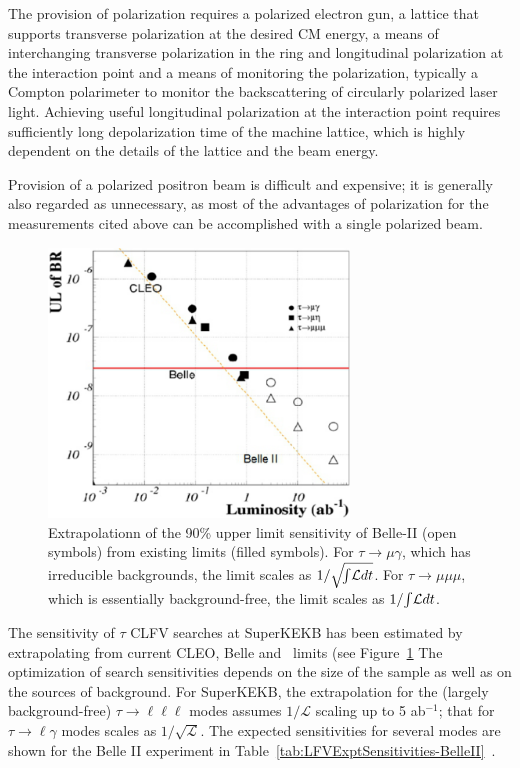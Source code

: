 The provision of polarization requires a polarized electron gun, 
a lattice that supports transverse
polarization at the desired CM energy, a means of interchanging transverse polarization in the
ring and longitudinal polarization at the interaction point and a means of monitoring
the polarization, typically a Compton polarimeter to monitor the
backscattering of circularly polarized laser light. Achieving useful longitudinal polarization at the interaction point requires sufficiently long depolarization time of the machine lattice, which is highly dependent on the details of the lattice and the beam energy.

Provision of a
polarized positron beam is difficult and expensive; it is generally
also regarded as unnecessary, as most of the
advantages of polarization for the measurements cited above can be
accomplished with a single polarized beam.

\begin{figure}[htb]

\begin{center}
\includegraphics[width=8cm]{ChargedLeptons/Figures/Belle-tau.pdf}
\smallskip
\caption{\label{CL:Belle}Extrapolationn of the 90\% upper limit sensitivity of Belle-II (open symbols) from existing limits (filled symbols). For $\tau\rightarrow \mu\gamma$, which has irreducible backgrounds, the limit scales as $1/{\sqrt{\!\int{\!\cal{L}}dt}}$. For $\tau\rightarrow \mu\mu\mu$, which is essentially background-free, the limit scales as $1/{\int{\!\cal{L}}dt}$.}
\end{center}
\end{figure}

The sensitivity of $\tau$ CLFV searches at SuperKEKB has been estimated by extrapolating from current CLEO, Belle and \babar\  
limits (see Figure~\ref{CL:Belle} The optimization of search sensitivities depends on the size
of the sample as well as on the sources of background. For SuperKEKB, the
extrapolation for the (largely background-free) $\tau\to\ell\ell\ell$
modes assumes $1/{\mathcal L}$ scaling up to 5 ab$^{-1}$; that for $\tau\to\ell\gamma$
modes scales as $1/{\sqrt{\mathcal L}}$. 
The expected sensitivities for several modes are shown for the Belle II experiment in Table~\ref{tab:LFVExptSensitivities-BelleII}~\cite{Abe:2010sj}.  

